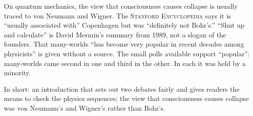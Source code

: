 \begin{afterword}
On quantum mechanics, the view that consciousness causes collapse is usually traced to von Neumann and Wigner. The \textsc{Stanford Encyclopedia} says it is ``usually associated with'' Copenhagen but was ``definitely not Bohr's.'' ``Shut up and calculate'' is David Mermin's summary from 1989, not a slogan of the founders. That many-worlds ``has become very popular in recent decades among physicists'' is given without a source. The small polls available support ``popular'': many-worlds came second in one and third in the other. In each it was held by a minority.

In short: an introduction that sets out two debates fairly and gives readers the means to check the physics sequences; the view that consciousness causes collapse was von Neumann's and Wigner's rather than Bohr's.
\end{afterword}
